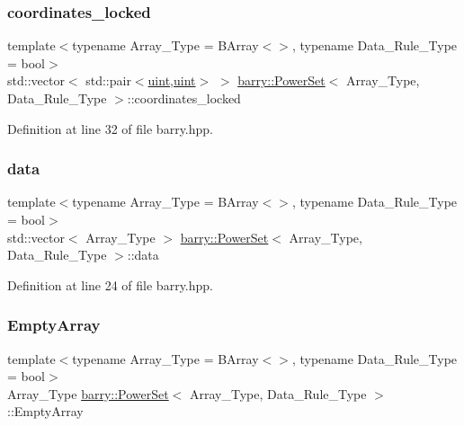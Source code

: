 \subsubsection{\texorpdfstring{coordinates\+\_\+locked}{coordinates\_locked}}
{\footnotesize\ttfamily template$<$typename Array\+\_\+\+Type  = B\+Array$<$$>$, typename Data\+\_\+\+Rule\+\_\+\+Type  = bool$>$ \\
std\+::vector$<$ std\+::pair$<$\hyperlink{namespacebarry_a11dfc53ddb4672278319aa04f1e09a6c}{uint},\hyperlink{namespacebarry_a11dfc53ddb4672278319aa04f1e09a6c}{uint}$>$ $>$ \hyperlink{classbarry_1_1_power_set}{barry\+::\+Power\+Set}$<$ Array\+\_\+\+Type, Data\+\_\+\+Rule\+\_\+\+Type $>$\+::coordinates\+\_\+locked}



Definition at line 32 of file barry.\+hpp.

\mbox{\label{classbarry_1_1_power_set_a90fecd17a9d1f36153c07bc929b1630f}} 
\subsubsection{\texorpdfstring{data}{data}}
{\footnotesize\ttfamily template$<$typename Array\+\_\+\+Type  = B\+Array$<$$>$, typename Data\+\_\+\+Rule\+\_\+\+Type  = bool$>$ \\
std\+::vector$<$ Array\+\_\+\+Type $>$ \hyperlink{classbarry_1_1_power_set}{barry\+::\+Power\+Set}$<$ Array\+\_\+\+Type, Data\+\_\+\+Rule\+\_\+\+Type $>$\+::data}



Definition at line 24 of file barry.\+hpp.

\mbox{\label{classbarry_1_1_power_set_a7709618ce9c3d9346499c7b23b91392a}} 
\subsubsection{\texorpdfstring{Empty\+Array}{EmptyArray}}
{\footnotesize\ttfamily template$<$typename Array\+\_\+\+Type  = B\+Array$<$$>$, typename Data\+\_\+\+Rule\+\_\+\+Type  = bool$>$ \\
Array\+\_\+\+Type \hyperlink{classbarry_1_1_power_set}{barry\+::\+Power\+Set}$<$ Array\+\_\+\+Type, Data\+\_\+\+Rule\+\_\+\+Type $>$\+::Empty\+Array}



